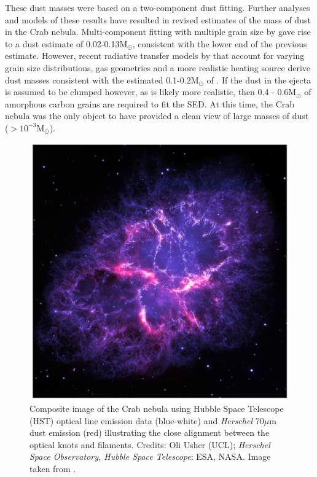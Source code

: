  These dust masses were based on a two-component dust fitting.  Further analyses and models of these results have resulted in revised estimates of the mass of dust in the Crab nebula.  Multi-component fitting with multiple grain size by \citet{Temim2013} gave rise to a dust estimate of 0.02-0.13M$_{\odot}$, consistent with the lower end of the previous estimate.  However, recent radiative transfer models by \citet{Owen2015} that account for varying grain size distributions, gas geometries and a more realistic heating source derive dust masses consistent with the estimated 0.1-0.2M$_{\odot}$ of \citet{Gomez2012}.  If the dust in the ejecta is assumed to be clumped however, as is likely more realistic, then 0.4 - 0.6M$_{\odot}$ of amorphous carbon grains are required to fit the SED.  At this time, the Crab nebula was the only object to have provided a clean view of large masses of dust ($>10^{-3}$M$_{\odot}$).
 
 \begin{figure}
\centering
\includegraphics[clip=true,scale=0.3,trim= 0 0 0 0]{chapters/chapter1/figs/Crab.png}
\caption{Composite image of the Crab nebula using Hubble Space Telescope (HST) optical line emission data (blue-white) and {\em Herschel} 70$\mu$m dust emission (red) illustrating the close alignment between the optical knots and filaments.  Credits: Oli Usher (UCL); \textit{Herschel Space Observatory, Hubble Space Telescope}: ESA, NASA.  Image taken from \citet{Owen2015}.}
\label{fig:Crab}
\end{figure}
 
